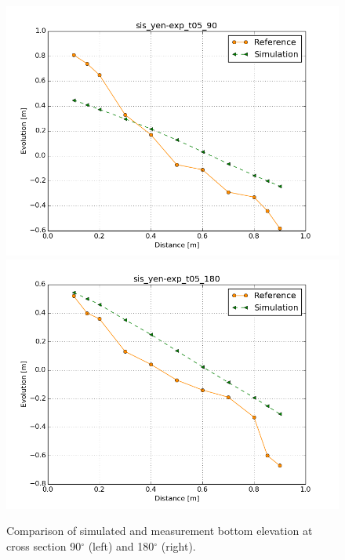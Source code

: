 \begin{figure} [!h]
\centering
\includegraphics[scale=0.25]{../img/sis_yen-exp_90.png}
\includegraphics[scale=0.25]{../img/sis_yen-exp_180.png}
 \caption{Comparison of simulated and measurement bottom elevation at cross section 90$^{\circ}$ (left) and 180$^{\circ}$ (right).}\label{fig:results2}
\end{figure}
